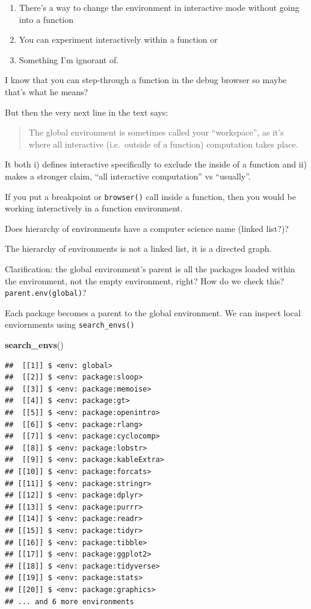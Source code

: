 \documentclass[]{book}
\newenvironment{Shaded}{\begin{snugshade}}{\end{snugshade}}
\newcommand{\KeywordTok}[1]{\textcolor[rgb]{0.13,0.29,0.53}{\textbf{#1}}}
\newcommand{\NormalTok}[1]{#1}
\providecommand{\tightlist}{%
  \setlength{\itemsep}{0pt}\setlength{\parskip}{0pt}}
\begin{document}
\begin{enumerate}
\def\labelenumi{\arabic{enumi}.}
\tightlist
\item
  There's a way to change the environment in interactive mode without going into a function
\item
  You can experiment interactively within a function or
\item
  Something I'm ignorant of.
\end{enumerate}

I know that you can step-through a function in the debug browser so maybe that's what he means?

But then the very next line in the text says:

\begin{quote}
The global environment is sometimes called your ``workspace'', as it's where all interactive (i.e.~outside of a function) computation takes place.
\end{quote}

It both i) defines interactive specifically to exclude the inside of a function and ii) makes a stronger claim, ``all interactive computation'' vs ``usually''.

If you put a breakpoint or \texttt{browser()} call inside a function, then you would be working interactively in a function environment.

Does hierarchy of environments have a computer science name (linked list?)?

The hierarchy of environments is not a linked list, it is a directed graph.

Clarification: the global environment's parent is all the packages loaded within the environment, not the empty environment, right? How do we check this? \texttt{parent.env(global)}?

Each package becomes a parent to the global environment. We can inspect local enviornments using \texttt{search\_envs()}

\begin{Shaded}
\begin{Highlighting}[]
\KeywordTok{search_envs}\NormalTok{()}
\end{Highlighting}
\end{Shaded}

\begin{verbatim}
##  [[1]] $ <env: global>
##  [[2]] $ <env: package:sloop>
##  [[3]] $ <env: package:memoise>
##  [[4]] $ <env: package:gt>
##  [[5]] $ <env: package:openintro>
##  [[6]] $ <env: package:rlang>
##  [[7]] $ <env: package:cyclocomp>
##  [[8]] $ <env: package:lobstr>
##  [[9]] $ <env: package:kableExtra>
## [[10]] $ <env: package:forcats>
## [[11]] $ <env: package:stringr>
## [[12]] $ <env: package:dplyr>
## [[13]] $ <env: package:purrr>
## [[14]] $ <env: package:readr>
## [[15]] $ <env: package:tidyr>
## [[16]] $ <env: package:tibble>
## [[17]] $ <env: package:ggplot2>
## [[18]] $ <env: package:tidyverse>
## [[19]] $ <env: package:stats>
## [[20]] $ <env: package:graphics>
## ... and 6 more environments
\end{verbatim}
\end{document}

